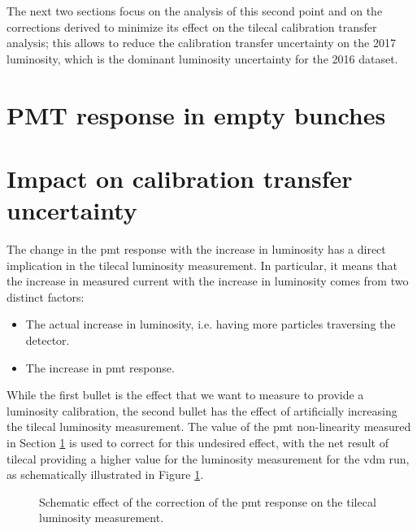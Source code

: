 The next two sections focus on the analysis of this second point and on the corrections derived to minimize its effect 
on the \gls{tilecal} calibration transfer analysis; this allows to reduce the calibration transfer uncertainty on the 
2017 luminosity, which is the dominant luminosity uncertainty for the 2016 dataset. 


\section{PMT response in empty bunches}
\label{sec:app:pmtresponse}

\section{Impact on calibration transfer uncertainty}

The change in the \gls{pmt} response with the increase in luminosity has a direct implication in the 
\gls{tilecal} luminosity measurement. 
In particular, it means that the increase in measured current with the increase in luminosity comes from 
two distinct factors:
\begin{itemize}
\item The actual increase in luminosity, i.e. having more particles traversing the detector.
\item The increase in \gls{pmt} response.
\end{itemize}

While the first bullet is the effect that we want to measure to provide a luminosity calibration, 
the second bullet has the effect of artificially increasing the \gls{tilecal} 
luminosity measurement. The value of the \gls{pmt} non-linearity measured in Section \ref{sec:app:pmtresponse} 
is used to correct for this undesired effect, with the net result of \gls{tilecal} providing a higher value 
for the luminosity measurement for the \gls{vdm} run, as schematically illustrated in Figure \ref{fig:apppmt:sketch}.


\begin{figure}[ht]
\centering
{}
\caption{Schematic effect of the correction of the \gls{pmt} response on the \gls{tilecal} luminosity measurement.}
\label{fig:apppmt:sketch}
\end{figure}


